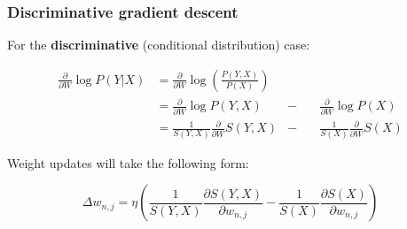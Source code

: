\documentclass{beamer}
\newcommand{\ddspn}[2]{\frac{\partial#1}{\partial#2}}
\begin{document}
\begin{frame}
  \frametitle{Discriminative gradient descent}

  For the \textbf{discriminative} (conditional distribution) case:

  \begin{align*}
    \ddspn{}{W}\log P(Y|X)&=\ddspn{}{W}\log\left(\frac{P(Y,X)}{P(X)}\right)\\
                          &=\ddspn{}{W}\log P(Y,X)&-\quad&\ddspn{}{W}\log P(X)\\
                          &=\frac{1}{S(Y,X)}\ddspn{}{W}S(Y,X)&-\quad&\frac{1}{S(X)}\ddspn{}{W}S(X)
  \end{align*}

  Weight updates will take the following form:

  \begin{equation*}
    \Delta w_{n,j}=\eta\left(\frac{1}{S(Y,X)}\ddspn{S(Y,X)}{w_{n,j}}-\frac{1}{S(X)}
      \ddspn{S(X)}{w_{n,j}}\right)
  \end{equation*}

\end{frame}
\end{document}
